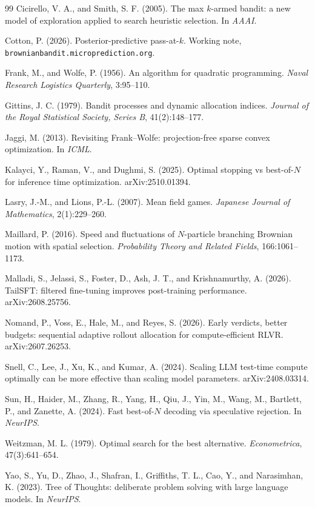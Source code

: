 \documentclass[11pt]{article}
\theoremstyle{itheads}
\begin{document}
\begin{thebibliography}{99}
Cicirello, V. A., and Smith, S. F. (2005).
The max $k$-armed bandit: a new model of exploration applied to search
heuristic selection.
In \emph{AAAI}.

Cotton, P. (2026).
Posterior-predictive pass-at-$k$.
Working note, \texttt{brownianbandit.microprediction.org}.

Frank, M., and Wolfe, P. (1956).
An algorithm for quadratic programming.
\emph{Naval Research Logistics Quarterly}, 3:95--110.

Gittins, J. C. (1979).
Bandit processes and dynamic allocation indices.
\emph{Journal of the Royal Statistical Society, Series B},
41(2):148--177.

Jaggi, M. (2013).
Revisiting Frank--Wolfe: projection-free sparse convex optimization.
In \emph{ICML}.

Kalayci, Y., Raman, V., and Dughmi, S. (2025).
Optimal stopping vs best-of-$N$ for inference time optimization.
arXiv:2510.01394.

Lasry, J.-M., and Lions, P.-L. (2007).
Mean field games.
\emph{Japanese Journal of Mathematics}, 2(1):229--260.

Maillard, P. (2016).
Speed and fluctuations of $N$-particle branching Brownian motion with
spatial selection.
\emph{Probability Theory and Related Fields}, 166:1061--1173.

Malladi, S., Jelassi, S., Foster, D., Ash, J. T., and Krishnamurthy, A.
(2026).
TailSFT: filtered fine-tuning improves post-training performance.
arXiv:2608.25756.

Nomand, P., Voss, E., Hale, M., and Reyes, S. (2026).
Early verdicts, better budgets: sequential adaptive rollout allocation
for compute-efficient RLVR.
arXiv:2607.26253.

Snell, C., Lee, J., Xu, K., and Kumar, A. (2024).
Scaling LLM test-time compute optimally can be more effective than
scaling model parameters.
arXiv:2408.03314.

Sun, H., Haider, M., Zhang, R., Yang, H., Qiu, J., Yin, M., Wang, M.,
Bartlett, P., and Zanette, A. (2024).
Fast best-of-$N$ decoding via speculative rejection.
In \emph{NeurIPS}.

Weitzman, M. L. (1979).
Optimal search for the best alternative.
\emph{Econometrica}, 47(3):641--654.

Yao, S., Yu, D., Zhao, J., Shafran, I., Griffiths, T. L., Cao, Y., and
Narasimhan, K. (2023).
Tree of Thoughts: deliberate problem solving with large language models.
In \emph{NeurIPS}.

\end{thebibliography}
\end{document}
